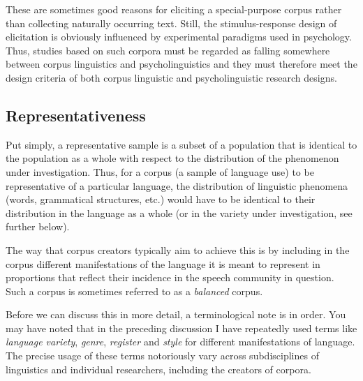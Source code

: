 These are sometimes good reasons for eliciting  a special\hyp{}purpose corpus rather than collecting naturally occurring text. Still, the stimulus\hyp{}response  design  of elicitation is obviously influenced by experimental  paradigms used in psychology.  Thus, studies based on such corpora must be regarded as falling somewhere between corpus linguistics and psycholinguistics  and they must therefore meet the design criteria of both corpus linguistic and psycholinguistic research  designs.

\subsection{Representativeness}
\label{sec:representativeness}

Put simply, a representative  sample  is a subset of a population that is identical to the population as a whole with respect to the distribution of the phenomenon under investigation. Thus, for a corpus (a sample of language use) to be representative of a particular language, the distribution of linguistic phenomena (words, grammatical structures, etc.) would have to be identical to their distribution in the language as a whole (or in the variety  under investigation, see further below).

The way that corpus creators typically aim to achieve this is by including in the corpus different manifestations of the language it is meant to represent in proportions that reflect their incidence in the speech community in question. Such a corpus is sometimes referred to as a \emph{balanced} corpus.

Before we can discuss this in more detail, a terminological note is in order. You may have noted that in the preceding discussion I have repeatedly used terms like \textit{language variety},  \textit{genre},  \textit{register}  and \textit{style}  for different manifestations of language. The precise usage of these terms notoriously vary across subdisciplines of linguistics and individual researchers, including the creators of corpora.

